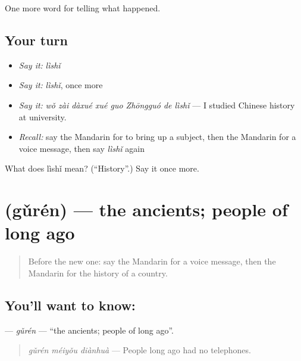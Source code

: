 \begin{grammarlens}[title={What you've built}]
One more word for telling what happened.
\end{grammarlens}

\subsection*{Your turn}
\begin{itemize}
\raggedright
  \item \emph{Say it:} \emph{lìshǐ}
  \item \emph{Say it:} \emph{lìshǐ}, once more
  \item \emph{Say it:} \emph{wǒ zài dàxué xué guo Zhōngguó de lìshǐ} — I studied Chinese history at university.
  \item \emph{Recall:} say the Mandarin for to bring up a subject, then the Mandarin for a voice message, then say \emph{lìshǐ} again
\end{itemize}

\begin{tcolorbox}[breakable,colback=teal!4,colframe=teal!35!black,title={Before you move on}]
What does lìshǐ mean? (\textquotedblleft{}History\textquotedblright{}.) Say it once more.
\end{tcolorbox}
\section[\texorpdfstring{\zh{古人} (gǔrén)}{古人 (gǔrén)}]{ (gǔrén) — the ancients; people of long ago}

\label{lesson:ZH-C321-guren}



\begin{quote}
Before the new one: say the Mandarin for a voice message, then the Mandarin for the history of a country.
\end{quote}

\subsection*{You'll want to know: }
\textbf{} — \emph{gǔrén} — \textquotedblleft{}the ancients; people of long ago\textquotedblright{}.

\begin{quote}
\textbf{} \emph{gǔrén méiyǒu diànhuà} — People long ago had no telephones.
\end{quote}

